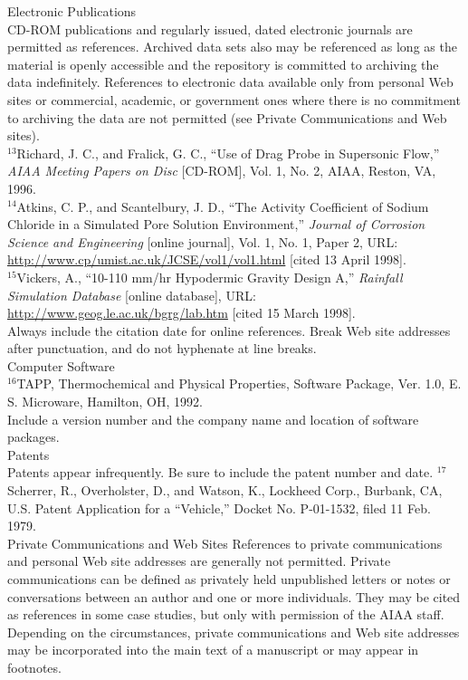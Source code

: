 Electronic Publications \\ CD-ROM publications and regularly issued, dated electronic journals are permitted as references. Archived data sets also may be referenced as long as the material is openly accessible and the repository is committed to archiving the data indefinitely. References to electronic data available only from personal Web sites or commercial, academic, or government ones where there is no commitment to archiving the data are not permitted (see Private Communications and Web sites). \\

$^{13}$Richard, J. C., and Fralick, G. C., “Use of Drag Probe in Supersonic Flow,” \textit{AIAA Meeting Papers on Disc} [CD-ROM], Vol. 1, No. 2, AIAA, Reston, VA, 1996. \\ $^{14}$Atkins, C. P., and Scantelbury, J. D., “The Activity Coefficient of Sodium Chloride in a Simulated Pore Solution Environment,” \textit{Journal of Corrosion Science and Engineering} [online journal], Vol. 1, No. 1, Paper 2, URL: \underline{http://www.cp/umist.ac.uk/JCSE/vol1/vol1.html} [cited 13 April 1998]. \\ $^{15}$Vickers, A., “10-110 mm/hr Hypodermic Gravity Design A,” \textit{Rainfall Simulation Database} [online database], URL: \underline{http://www.geog.le.ac.uk/bgrg/lab.htm} [cited 15 March 1998]. \\

Always include the citation date for online references. Break Web site addresses after punctuation, and do not hyphenate at line breaks. \\

Computer Software \\ $^{16}$TAPP, Thermochemical and Physical Properties, Software Package, Ver. 1.0, E. S. Microware, Hamilton, OH, 1992. \\

Include a version number and the company name and location of software packages. \\

Patents \\ Patents appear infrequently. Be sure to include the patent number and date. $^{17}$Scherrer, R., Overholster, D., and Watson, K., Lockheed Corp., Burbank, CA, U.S. Patent Application for a “Vehicle,” Docket No. P-01-1532, filed 11 Feb. 1979. \\

Private Communications and Web Sites References to private communications and personal Web site addresses are generally not permitted. Private communications can be defined as privately held unpublished letters or notes or conversations between an author and one or more individuals. They may be cited as references in some case studies, but only with permission of the AIAA staff. Depending on the circumstances, private communications and Web site addresses may be incorporated into the main text of a manuscript or may appear in footnotes. \\

